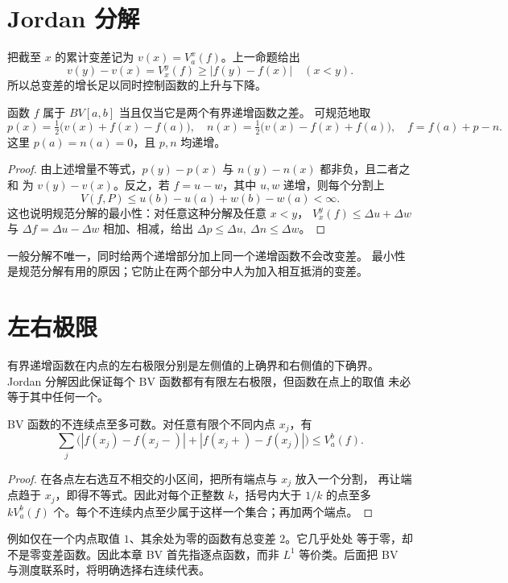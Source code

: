 \section{Jordan 分解}

把截至 \(x\) 的累计变差记为 \(v(x)=V_a^x(f)\)。上一命题给出
\[
 v(y)-v(x)=V_x^y(f)\ge |f(y)-f(x)|\quad(x<y).
\]
所以总变差的增长足以同时控制函数的上升与下降。

\begin{theorem}\label{thm:bv-jordan}
函数 \(f\) 属于 \(BV[a,b]\) 当且仅当它是两个有界递增函数之差。
可规范地取
\[
 p(x)=\tfrac12\bigl(v(x)+f(x)-f(a)\bigr),\quad
 n(x)=\tfrac12\bigl(v(x)-f(x)+f(a)\bigr),\quad
 f=f(a)+p-n.
\]
这里 \(p(a)=n(a)=0\)，且 \(p,n\) 均递增。
\end{theorem}
\begin{proof}
由上述增量不等式，\(p(y)-p(x)\) 与 \(n(y)-n(x)\) 都非负，且二者之和
为 \(v(y)-v(x)\)。反之，若 \(f=u-w\)，其中 \(u,w\) 递增，则每个分割上
\[
 V(f,P)\le u(b)-u(a)+w(b)-w(a)<\infty.
\]
这也说明规范分解的最小性：对任意这种分解及任意 \(x<y\)，
\(V_x^y(f)\le\Delta u+\Delta w\) 与 \(\Delta f=\Delta u-\Delta w\)
相加、相减，给出 \(\Delta p\le\Delta u,\ \Delta n\le\Delta w\)。
\end{proof}

一般分解不唯一，同时给两个递增部分加上同一个递增函数不会改变差。
最小性是规范分解有用的原因；它防止在两个部分中人为加入相互抵消的变差。

\section{左右极限}

有界递增函数在内点的左右极限分别是左侧值的上确界和右侧值的下确界。
Jordan 分解因此保证每个 BV 函数都有有限左右极限，但函数在点上的取值
未必等于其中任何一个。

\begin{proposition}
BV 函数的不连续点至多可数。对任意有限个不同内点 \(x_j\)，有
\[
 \sum_j\bigl(|f(x_j)-f(x_j-)|+|f(x_j+)-f(x_j)|\bigr)\le V_a^b(f).
\]
\end{proposition}
\begin{proof}
在各点左右选互不相交的小区间，把所有端点与 \(x_j\) 放入一个分割，
再让端点趋于 \(x_j\)，即得不等式。因此对每个正整数 \(k\)，括号内大于 \(1/k\) 的点至多
\(kV_a^b(f)\) 个。每个不连续内点至少属于这样一个集合；再加两个端点。
\end{proof}

例如仅在一个内点取值 \(1\)、其余处为零的函数有总变差 \(2\)。它几乎处处
等于零，却不是零变差函数。因此本章 BV 首先指逐点函数，而非 \(L^1\)
等价类。后面把 BV 与测度联系时，将明确选择右连续代表。

